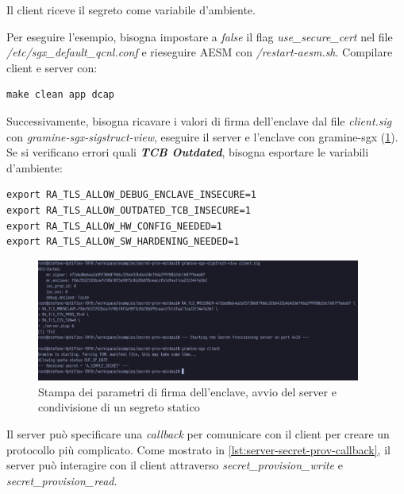 \documentclass{article}
\begin{document}
Il client riceve il segreto come variabile d'ambiente.



Per eseguire l'esempio, bisogna impostare a \textit{false} il flag \textit{use\_secure\_cert} nel file \textit{/etc/sgx\_default\_qcnl.conf} e rieseguire AESM con \textit{/restart-aesm.sh}. Compilare client e server con:
\begin{verbatim}
make clean app dcap 
\end{verbatim}

Successivamente, bisogna ricavare i valori di firma dell'enclave dal file \textit{client.sig} con \textit{gramine-sgx-sigstruct-view}, eseguire il server e l'enclave con gramine-sgx (\cref{fig:secret-prov-example}). Se si verificano errori quali \textbf{\textit{TCB Outdated}}, bisogna esportare le variabili d'ambiente:

\begin{verbatim}
export RA_TLS_ALLOW_DEBUG_ENCLAVE_INSECURE=1
export RA_TLS_ALLOW_OUTDATED_TCB_INSECURE=1
export RA_TLS_ALLOW_HW_CONFIG_NEEDED=1
export RA_TLS_ALLOW_SW_HARDENING_NEEDED=1 
\end{verbatim}

\begin{figure}[h]
  \begin{center}
    \includegraphics[width=0.95\textwidth]{figures/ch3/secret-prov-example.png}
  \end{center}
  \caption{Stampa dei parametri di firma dell'enclave, avvio del server e condivisione di un segreto statico}\label{fig:secret-prov-example}
\end{figure}

Il server può specificare una \textit{callback} per comunicare con il client per creare un protocollo più complicato. Come mostrato in \cref{lst:server-secret-prov-callback}, il server può interagire con il client attraverso \textit{secret\_provision\_write} e \textit{secret\_provision\_read}.
\end{document}
